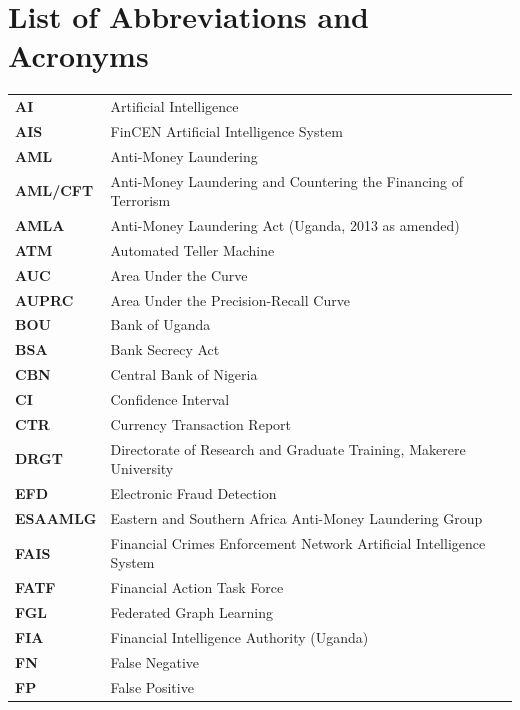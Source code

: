 \chapter*{List of Abbreviations and Acronyms}

\begin{longtable}{@{}p{3.2cm}p{12.8cm}@{}}
\textbf{AI} & Artificial Intelligence \\
\textbf{AIS} & FinCEN Artificial Intelligence System \\
\textbf{AML} & Anti-Money Laundering \\
\textbf{AML/CFT} & Anti-Money Laundering and Countering the Financing of Terrorism \\
\textbf{AMLA} & Anti-Money Laundering Act (Uganda, 2013 as amended) \\
\textbf{ATM} & Automated Teller Machine \\
\textbf{AUC} & Area Under the Curve \\
\textbf{AUPRC} & Area Under the Precision-Recall Curve \\
\textbf{BOU} & Bank of Uganda \\
\textbf{BSA} & Bank Secrecy Act \\
\textbf{CBN} & Central Bank of Nigeria \\
\textbf{CI} & Confidence Interval \\
\textbf{CTR} & Currency Transaction Report \\
\textbf{DRGT} & Directorate of Research and Graduate Training, Makerere University \\
\textbf{EFD} & Electronic Fraud Detection \\
\textbf{ESAAMLG} & Eastern and Southern Africa Anti-Money Laundering Group \\
\textbf{FAIS} & Financial Crimes Enforcement Network Artificial Intelligence System \\
\textbf{FATF} & Financial Action Task Force \\
\textbf{FGL} & Federated Graph Learning \\
\textbf{FIA} & Financial Intelligence Authority (Uganda) \\
\textbf{FN} & False Negative \\
\textbf{FP} & False Positive \\

\end{longtable}
